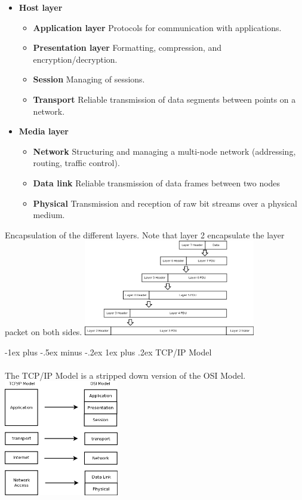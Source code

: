 \documentclass[10pt,landscape]{article}
\makeatletter
\renewcommand{\subsubsection}{\@startsection{subsubsection}{3}{0mm}%
                                {-1ex plus -.5ex minus -.2ex}%
                                {1ex plus .2ex}%
                                {\normalfont\small\bfseries}}
\makeatother
\begin{document}
\begin{multicols}{3}
\begin{itemize}
	\item \textbf{Host layer}
	\begin{itemize}
		\item \textbf{Application layer} Protocols for communication with applications.
		\item \textbf{Presentation layer} Formatting, compression, and encryption/decryption.
		\item \textbf{Session} Managing of sessions.
		\item \textbf{Transport} Reliable transmission of data segments between points on a network.
	\end{itemize}
	\item \textbf{Media layer}
	\begin{itemize}
		\item \textbf{Network} Structuring and managing a multi-node network (addressing, routing, traffic control).
		\item \textbf{Data link} Reliable transmission of data frames between two nodes
		\item \textbf{Physical} Transmission and reception of raw bit streams over a physical medium.
	\end{itemize}
\end{itemize}

Encapsulation of the different layers. Note that layer 2 encapsulate the layer packet on both sides.
\includegraphics[width=7.5cm]{data_encapsulation}

\subsubsection{TCP/IP Model}
\paragraph{}
The TCP/IP Model is a stripped down version of the OSI Model. \\
\includegraphics[width=5cm]{TCP_IP_model}


\end{multicols}
\end{document}
